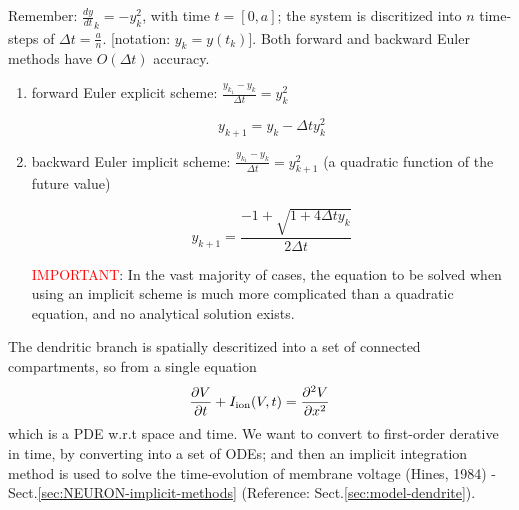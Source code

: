 \begin{mdframed}

Remember: $\frac{dy}{dt}_k = -y^2_k$, with time $t=[0,a]$; the system is
discritized into $n$ time-steps of $\Delta t = \frac{a}{n}$.
[notation: $y_k = y(t_k)$]. Both forward and backward Euler methods have
$O(\Delta t)$ accuracy.

\begin{enumerate}
  \item forward Euler explicit scheme: $\frac{y_{k_1}-y_k}{\Delta t}= y^2_{k}$
  
\begin{equation*}
y_{k+1} = y_k - \Delta t y^2_k
\end{equation*}

  \item backward Euler implicit scheme: 
  $\frac{y_{k_1}-y_k}{\Delta t}= y^2_{k+1}$ (a quadratic function of the future value)

\begin{equation*}
y_{k+1} = \frac{-1 + \sqrt{1 + 4\Delta t y_k}}{2\Delta t}
\end{equation*}

\textcolor{red}{IMPORTANT}: In the vast majority of cases, the equation to be
solved when using an implicit scheme is much more complicated than a quadratic
equation, and no analytical solution exists.

\end{enumerate}

\end{mdframed}

The dendritic branch is spatially descritized into a set of connected
compartments, so from a single equation
\begin{equation}
\frac{\partial V}{\partial t} + I_{\text{ion}}(V,t) = \frac{\partial^2 V}{\partial x^2}
\end{equation}
which is a PDE w.r.t space and time. 
We want to convert to first-order derative
in time, by converting into a set of ODEs; and then an implicit integration method is used to solve the time-evolution of membrane
voltage (Hines, 1984) - Sect.\ref{sec:NEURON-implicit-methods} (Reference:
Sect.\ref{sec:model-dendrite}).

